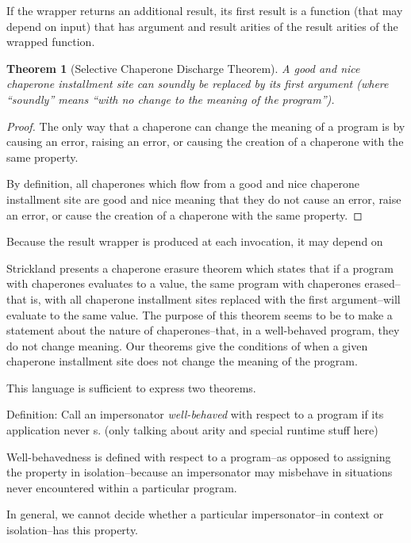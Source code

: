\documentclass{sigplanconf}
\newtheorem{thm}{Theorem}
\begin{document}
If the wrapper returns an additional result, its first result is a function (that may depend on input) that has argument and result arities of the result arities of the wrapped function.

\begin{thm}[Selective Chaperone Discharge Theorem]
A good and nice chaperone installment site can soundly be replaced by its first argument (where ``soundly'' means ``with no change to the meaning of the program'').
\end{thm}

\begin{proof}
The only way that a chaperone can change the meaning of a program is by causing an error, raising an error, or causing the creation of a chaperone with the same property.

By definition, all chaperones which flow from a good and nice chaperone installment site are good and nice meaning that they do not cause an error, raise an error, or cause the creation of a chaperone with the same property.
\end{proof}


Because the result wrapper is produced at each invocation, it may depend on 

Strickland presents a chaperone erasure theorem which states that if a program with chaperones evaluates to a value, the same program with chaperones erased--that is, with all chaperone installment sites replaced with the first argument--will evaluate to the same value. The purpose of this theorem seems to be to make a statement about the nature of chaperones--that, in a well-behaved program, they do not change meaning. Our theorems give the conditions of when a given chaperone installment site does not change the meaning of the program.

This language is sufficient to express two theorems.

Definition: Call an impersonator \emph{well-behaved} with respect to a program if its application never s.
(only talking about arity and special runtime stuff here)

Well-behavedness is defined with respect to a program--as opposed to assigning the property in isolation--because an impersonator may misbehave in situations never encountered within a particular program.

In general, we cannot decide whether a particular impersonator--in context or isolation--has this property.
\end{document}
